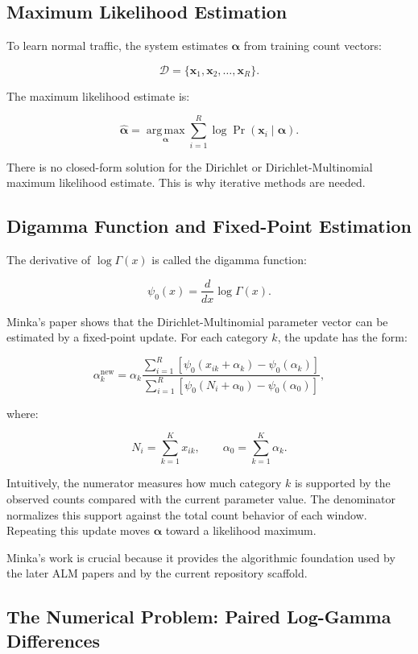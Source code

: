 \documentclass[11pt,a4paper]{article}
\begin{document}
\subsection{Maximum Likelihood Estimation}

To learn normal traffic, the system estimates \(\boldsymbol{\alpha}\) from training count vectors:

\[
\mathcal{D}=\{\mathbf{x}_1,\mathbf{x}_2,\ldots,\mathbf{x}_R\}.
\]

The maximum likelihood estimate is:

\[
\hat{\boldsymbol{\alpha}}
=
\underset{\boldsymbol{\alpha}}{\operatorname{arg\,max}}
\sum_{i=1}^{R}\log \Pr(\mathbf{x}_i\mid\boldsymbol{\alpha}).
\]

There is no closed-form solution for the Dirichlet or Dirichlet-Multinomial maximum likelihood estimate. This is why iterative methods are needed.

\subsection{Digamma Function and Fixed-Point Estimation}

The derivative of \(\log\Gamma(x)\) is called the digamma function:

\[
\psi_0(x)=\frac{d}{dx}\log\Gamma(x).
\]

Minka's paper shows that the Dirichlet-Multinomial parameter vector can be estimated by a fixed-point update. For each category \(k\), the update has the form:

\[
\alpha_k^{\mathrm{new}}
=
\alpha_k
\frac{
\sum_{i=1}^{R}\left[\psi_0(x_{ik}+\alpha_k)-\psi_0(\alpha_k)\right]
}{
\sum_{i=1}^{R}\left[\psi_0(N_i+\alpha_0)-\psi_0(\alpha_0)\right]
},
\]

where:

\[
N_i=\sum_{k=1}^{K}x_{ik},\qquad \alpha_0=\sum_{k=1}^{K}\alpha_k.
\]

Intuitively, the numerator measures how much category \(k\) is supported by the observed counts compared with the current parameter value. The denominator normalizes this support against the total count behavior of each window. Repeating this update moves \(\boldsymbol{\alpha}\) toward a likelihood maximum.

Minka's work is crucial because it provides the algorithmic foundation used by the later ALM papers and by the current repository scaffold.

\subsection{The Numerical Problem: Paired Log-Gamma Differences}
\end{document}
